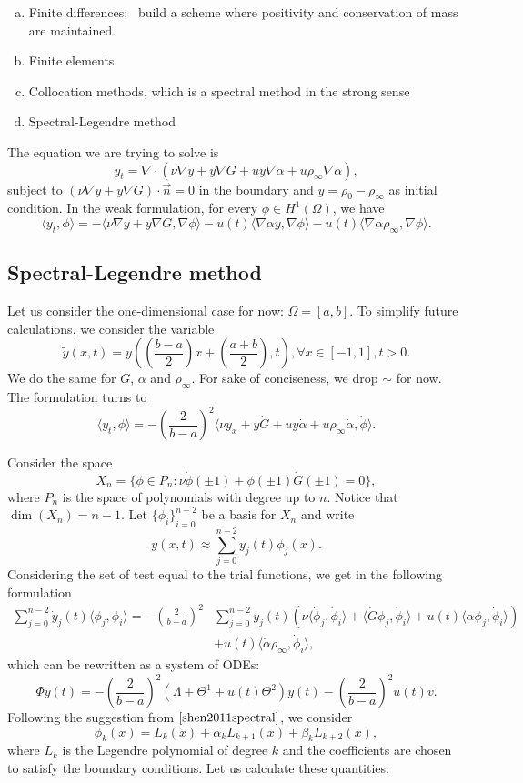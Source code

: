 \documentclass[12pt]{article}
\newcommand{\n}{\vec{n}}
\newcommand{\steady}{\rho_{\infty}}
\newcommand{\inner}[2]{\langle{} #1, #2 \rangle{}}
\theoremstyle{definition}
\begin{document}
\begin{enumerate}[(a)]
    \item Finite differences:~\cite{chang1970practical} build a scheme where positivity and conservation of mass are maintained.
    \item Finite elements
    \item Collocation methods, which is a spectral method in the strong sense
    \item Spectral-Legendre method
\end{enumerate}

The equation we are trying to solve is 
\[
y_t = \nabla \cdot (\nu \nabla y + y \nabla G + u y \nabla \alpha + u \steady \nabla \alpha),
\]
subject to $(\nu \nabla y + y \nabla G) \cdot \n = 0$ in the boundary and $y = \rho_0 - \steady$ as initial condition.
In the weak formulation, for every $\phi \in H^1(\Omega)$, we have
\[
\inner{y_t}{\phi} = -\inner{\nu \nabla y + y \nabla G}{\nabla \phi} - u(t)\inner{\nabla \alpha y}{\nabla \phi} - u(t)\inner{ \nabla \alpha \steady}{\nabla \phi}.
\]

\subsection{Spectral-Legendre method}

Let us consider the one-dimensional case for now: $\Omega = [a,b]$.
To simplify future calculations, we consider the variable
\[
\tilde{y}(x,t) = y\left(\left(\frac{b-a}{2}\right)x + \left(\frac{a+b}{2}\right), t\right), \forall x \in [-1,1], t > 0.    
\]
We do the same for $G$, $\alpha$ and $\steady$. 
For sake of conciseness, we drop $\sim$ for now.
The formulation turns to 
\[
\inner{y_t}{\phi} = - {\left(\frac{2}{b-a}\right)}^2\inner{\nu y_x + y \dot{G} + u y \dot{\alpha} + u\steady \dot{\alpha}}{\dot{\phi}}.
\]

Consider the space 
\[
X_n = \{\phi \in P_n : \nu \dot{\phi}(\pm 1) + \phi(\pm 1) \dot{G}(\pm 1) = 0\},
\]
where $P_n$ is the space of polynomials with degree up to $n$.
Notice that $\dim(X_n) = n-1$.
Let ${\{\phi_i\}}_{i=0}^{n-2}$ be a basis for $X_n$ and write 
\[
y(x,t) \approx \sum_{j=0}^{n-2} y_j(t) \phi_j(x). 
\]
Considering the set of test equal to the trial functions, we get in the following formulation
\[
\begin{split}
    \sum_{j=0}^{n-2} \dot{y}_j(t) \inner{\phi_j}{\phi_i} = -{\left(\frac{2}{b-a}\right)}^2 &\sum_{j=0}^{n-2} y_j(t) \left(\nu \inner{\dot{\phi}_j}{\dot{\phi}_i} + \inner{\dot{G} \phi_j}{\dot{\phi}_i} + u(t)\inner{\dot{\alpha}\phi_j}{\dot{\phi}_i} \right) \\ 
    &+ u(t) \inner{\dot{\alpha} \steady}{\dot{\phi}_i},
\end{split}
\]
which can be rewritten as a system of ODEs:
\[
\Phi \dot{y}(t) = -{\left(\frac{2}{b-a}\right)}^2 (\Lambda + \Theta^1 + u(t)\Theta^2)y(t) - {\left(\frac{2}{b-a}\right)}^2u(t)v.    
\]
Following the suggestion from $\cite[p.7]{shen2011spectral}$, we consider
\[
\phi_k(x) = L_k(x) + \alpha_k L_{k+1}(x) + \beta_k L_{k+2}(x),    
\]
where $L_k$ is the Legendre polynomial of degree $k$ and the coefficients are chosen to satisfy the boundary conditions. 
Let us calculate these quantities:
\end{document}
